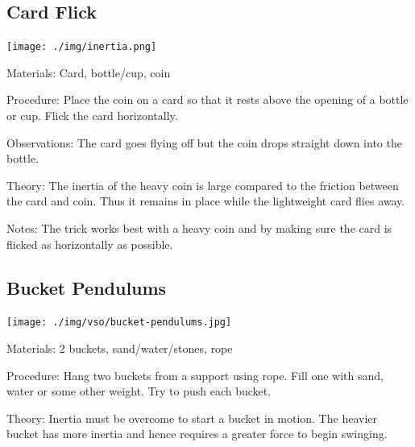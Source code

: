 \begin{multicols}{2}
\subsection{Card Flick}

\begin{center}
\texttt{[image: ./img/inertia.png]}
\end{center}

\begin{description*}
\item[Materials:]{Card, bottle/cup, coin}
\item[Procedure:]{Place the coin on a card so that it rests above the opening of a bottle or cup. Flick the card horizontally.}
\item[Observations:]{The card goes flying off but the coin drops straight down into the bottle.}
\item[Theory:]{The inertia of the heavy coin is large compared to the friction between the card and coin. Thus it remains in place while the lightweight card flies away.}
\item[Notes:]{The trick works best with a heavy coin and by making sure the card is flicked as horizontally as possible.}
\end{description*}

\subsection{Bucket Pendulums}

\begin{center}
\texttt{[image: ./img/vso/bucket-pendulums.jpg]}
\end{center}

\begin{description*}
\item[Materials:]{2 buckets, sand/water/stones, rope}
\item[Procedure:]{Hang two buckets from a support using rope. Fill one with sand, water or some other weight. Try to push each bucket.}
\item[Theory:]{Inertia must be overcome to start a bucket in motion. The heavier bucket has more inertia and hence requires a greater force to begin swinging.}
\end{description*}


\end{multicols}
